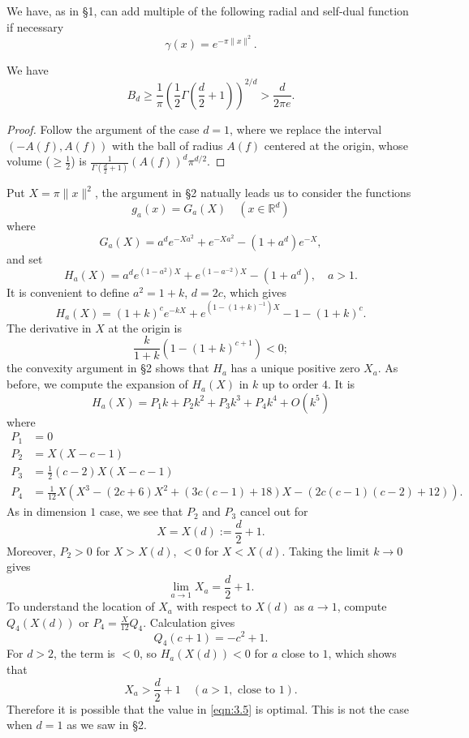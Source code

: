 We have, as in \S 1, can add multiple of the following radial and self-dual function if necessary
\[
    \gamma(x) = e^{-\pi \|x\|^2}.
\]

\begin{theorem}
\label{thm:3.1}
We have
\[
B_d \geq \frac{1}{\pi}\left(\frac{1}{2}\Gamma\left(\frac{d}{2} + 1\right)\right)^{2/d} > \frac{d}{2 \pi e}.
\]
\end{theorem}
\begin{proof}
Follow the argument of the case $d = 1$, where we replace the interval $(-A(f), A(f))$ with the ball of radius $A(f)$ centered at the origin, whose volume ($\geq \frac{1}{2}$) is $\frac{1}{\Gamma(\frac{d}{2} + 1)}(A(f))^{d} \pi^{d/2}$.
\end{proof}

Put $X = \pi \|x\|^2$, the argument in \S 2 natually leads us to consider the functions
\[
    g_a(x) = G_a(X) \quad (x \in \mathbb{R}^{d})
\]
where
\[
    G_a(X) = a^d e^{-X a^2} + e^{-X a^2} - (1 + a^d) e^{-X},
\]
and set
\[
    H_a(X) = a^d e^{(1-a^2)X} + e^{(1 - a^{-2})X} - (1 + a^d), \quad a > 1.
\]
It is convenient to define $a^2 = 1 + k$, $d = 2c$, which gives
\[
    H_a(X) = (1 + k)^{c} e^{-kX} + e^{(1 - (1+k)^{-1})X} - 1 - (1 + k)^{c}.
\]
The derivative in $X$ at the origin is
\[
    \frac{k}{1 + k}\left(1 - (1+k)^{c+1}\right) < 0;
\]
the convexity argument in \S 2 shows that $H_a$ has a unique positive zero $X_a$.
As before, we compute the expansion of $H_a(X)$ in $k$ up to order $4$.
It is
\[
    H_a(X) = P_1 k + P_2 k^2 + P_3 k^3 + P_4 k^4 + O(k^5)
\]
where
\begin{align*}
    P_1 &= 0 \\
    P_2 &= X(X - c - 1) \\
    P_3 &= \frac{1}{2}(c - 2)X(X-c-1) \\
    P_4 &= \frac{1}{12} X(X^3 - (2c + 6)X^2 + (3c(c-1) + 18)X - (2c(c-1)(c-2) + 12)).
\end{align*}
As in dimension $1$ case, we see that $P_2$ and $P_3$ cancel out for
\begin{equation}
    \label{eqn:3.5}
    X = X(d) := \frac{d}{2} + 1.
\end{equation}
Moreover, $P_2 > 0$  for $X > X(d)$, $<0$ for $X < X(d)$.
Taking the limit $k \to 0$ gives
\[
    \lim_{a \to 1} X_a = \frac{d}{2} + 1.
\]
To understand the location of $X_a$ with respect to $X(d)$ as $a \to 1$, compute $Q_4(X(d))$ or $P_4 = \frac{X}{12}Q_4$.
Calculation gives
\[
    Q_4(c+1) = -c^2 + 1.
\]
For $d > 2$, the term is $<0$, so $H_a(X(d)) < 0$ for $a$ close to $1$, which shows that
\[
    X_a > \frac{d}{2} + 1 \quad(a > 1, \text{ close to }1).
\]
Therefore it is possible that the value in \eqref{eqn:3.5} is optimal.
This is not the case when $d = 1$ as we saw in \S 2.

